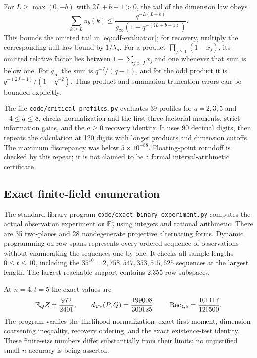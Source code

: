 For $L\ge\max(0,-b)$ with $2L+b+1>0$, the tail of the dimension law obeys
\begin{equation}
 \sum_{k\ge L}\pi_b(k)
 \le\frac{q^{-L(L+b)}}{g_\infty(1-q^{-(2L+b+1)})}.
 \label{eq:tail-compute}
\end{equation}
This bounds the omitted tail in \eqref{eq:cdf-evaluation}; for recovery,
multiply the corresponding null-law bound by $1/\lambda_a$.
For a product $\prod_{j\ge1}(1-x_j)$, its omitted relative factor lies
between $1-\sum_{j>J}x_j$ and one whenever that sum is below one.
For $g_\infty$ the sum is $q^{-J}/(q-1)$, and for the odd product
it is $q^{-(2J+1)}/(1-q^{-2})$. Thus product and summation truncation
errors can be bounded explicitly.

The file \texttt{code/critical\_profiles.py} evaluates 39 profiles for
$q=2,3,5$ and $-4\le a\le8$, checks normalization and the first three
factorial moments, strict information gains, and the $a\ge0$ recovery
identity. It uses 90 decimal digits, then repeats the calculation at 120
digits with longer products and dimension cutoffs. The maximum discrepancy
was below $5\times10^{-88}$. Floating-point roundoff is checked by this
repeat; it is not claimed to be a formal interval-arithmetic certificate.

\subsection{Exact finite-field enumeration}

The standard-library program \texttt{code/exact\_binary\_experiment.py}
computes the actual observation experiment on $\mathbb F_2^4$ using
integers and rational arithmetic. There are 35 two-planes and 28
nondegenerate projective alternating forms. Dynamic programming on row
spans represents every ordered sequence of observations without enumerating
the sequences one by one. It checks all sample lengths $0\le t\le10$,
including the $35^{10}=2{,}758{,}547{,}353{,}515{,}625$ sequences at the
largest length. The largest reachable support contains 2,355 row subspaces.

At $n=4,t=5$ the exact values are
\[
 \mathbb E_QZ=\frac{972}{2401},\qquad
 d_{\mathrm{TV}}(P,Q)=\frac{199008}{300125},\qquad
 \operatorname{Rec}_{4,5}=\frac{101117}{121500}.
\]
The program verifies the likelihood normalization, exact first moment,
dimension coarsening inequality, recovery ordering, and the exact
existence-test identity. These finite-size numbers differ substantially
from their limits; no unjustified small-$n$ accuracy is being asserted.

